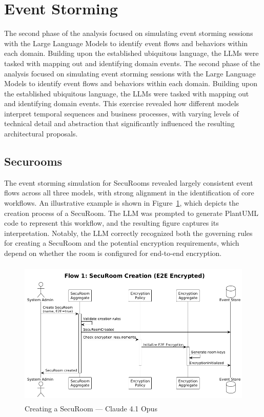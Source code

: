 \section{Event Storming}
The second phase of the analysis focused on simulating event storming sessions with the Large Language Models to identify event flows and behaviors within each domain. Building upon the established ubiquitous language, the LLMs were tasked with mapping out and identifying domain events. The second phase of the analysis focused on simulating event storming sessions with the Large Language Models to identify event flows and behaviors within each domain. Building upon the established ubiquitous language, the LLMs were tasked with mapping out and identifying domain events. This exercise revealed how different models interpret temporal sequences and business processes, with varying levels of technical detail and abstraction that significantly influenced the resulting architectural proposals.

\subsection{Securooms}
The event storming simulation for SecuRooms revealed largely consistent event flows across all three models, with strong alignment in the identification of core workflows. An illustrative example is shown in Figure~\ref{fig:event-create-securoom-claude}, which depicts the creation process of a SecuRoom. The LLM was prompted to generate PlantUML code to represent this workflow, and the resulting figure captures its interpretation. Notably, the LLM correctly recognized both the governing rules for creating a SecuRoom and the potential encryption requirements, which depend on whether the room is configured for end-to-end encryption.

\begin{figure}[H]
  \centering
  \begin{adjustbox}{max width=\textwidth}
      \includegraphics[height=7cm]{figures/create-securoom-claude.png} 
  \end{adjustbox}
  \caption{Creating a SecuRoom — Claude 4.1 Opus}
  \label{fig:event-create-securoom-claude} 
\end{figure}


